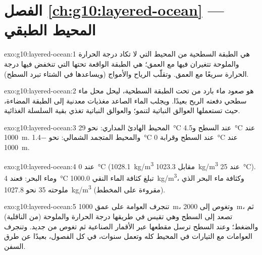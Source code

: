 \section*{الفصل \ref{ch:g10:layered-ocean} --- المحيط الطبقي}

\begin{solution}{exo:g10:layered-ocean:1}
 هي الطبقة السطحية من المحيط التي لا تكاد درجة الحرارة والملوحة
تتغيران فيها مع العمق؛  هي الطبقة الواقعة تحتها التي تنخفض
فيها درجة الحرارة سريعًا مع العمق. وتقلّب الرياح والأمواج  (ويساعدها
في الشتاء تبرد السطح).
\end{solution}

\begin{solution}{exo:g10:layered-ocean:2}
 هو صعود ماء بارد من تحت الطبقة السطحية، ليحل محل ماء سطحي دفعته الريح
بعيدًا. ويجلب الماء الصاعد مغذيات معدنية إلى الطبقة المضاءة، حيث تستعملها العوالق
النباتية لتنمو؛ والعوالق النباتية تغذي بقية السلسلة الغذائية.
\end{solution}

\begin{solution}{exo:g10:layered-ocean:3}
المحيط الهادئ المداري: نحو \qty{29}{\degreeCelsius} عند السطح
و\qty{4.5}{\degreeCelsius} عند \qty{1000}{m}. والمحيط المتجمد الشمالي: نحو
\qty{-1.4}{\degreeCelsius} عند السطح وقرابة
\qty{0}{\degreeCelsius} عند \qty{1000}{m}.
\end{solution}

\begin{solution}{exo:g10:layered-ocean:4}
عند \qty{0}{\degreeCelsius} (\qty{1028.1}{kg/m^3} مقابل \qty{1023.3}{kg/m^3}
عند \qty{25}{\degreeCelsius}). وماء البحر: فعند \qty{4}{\degreeCelsius} تبلغ كثافة
الماء النقي \qty{1000.0}{kg/m^3}، وكثافة ماء البحر الذي ملوحته 35 نحو
\qty{1027.8}{kg/m^3} (مقروءة على المخطط).
\end{solution}

\begin{solution}{exo:g10:layered-ocean:5}
تنجرف العوامة على عمق \qty{1000}{m}، وتغوص إلى \qty{2000}{m}، ثم تصعد إلى
السطح وهي تقيس في طريقها درجة الحرارة والملوحة (من الناقلية) والضغط؛ وعند السطح
ترسل مقطعها عبر الأقمار الصناعية ثم تغوص من جديد. وتنجرف العوامات مع التيارات في
المحيط كله وتعمل سنوات، في كل الفصول، بعيدًا عن طرق السفن.
\end{solution}

